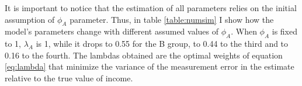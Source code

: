 It is important to notice that the estimation of all parameters relies on the initial assumption of $\phi_A$ parameter. Thus, in table \ref{table:numsim} I show how the model's parameters change with different assumed values of $\phi_A$.
When $\phi_A$ is fixed to 1, $\lambda_A$ is 1, while it drops to 0.55 for the B group, to 0.44 to the third and to 0.16 to the fourth.
The lambdas obtained are the optimal weights of equation \ref{eq:lambda} that minimize the variance of the measurement error in the estimate relative to the true value of income. 
\begin{table}
\centering
{}
\caption{Results for different values of fixed $\phi_A$.}
\label{table:numsim}
\end{table}

